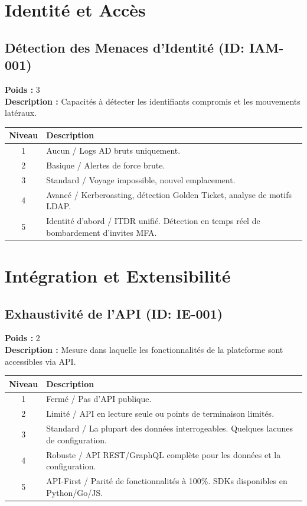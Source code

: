 \documentclass{article}
\begin{document}
\section{Identité et Accès}
\subsection{Détection des Menaces d'Identité (ID: IAM-001)}
\textbf{Poids :} 3 \\
\textbf{Description :} Capacités à détecter les identifiants compromis et les mouvements latéraux.
\vspace{0.3cm}
\begin{longtable}{|c|p{12cm}|}
\hline
\rowcolor{lightgray} \textbf{Niveau} & \textbf{Description} \\ \hline
1 & Aucun / Logs AD bruts uniquement. \\ \hline
2 & Basique / Alertes de force brute. \\ \hline
3 & Standard / Voyage impossible, nouvel emplacement. \\ \hline
4 & Avancé / Kerberoasting, détection Golden Ticket, analyse de motifs LDAP. \\ \hline
5 & Identité d'abord / ITDR unifié. Détection en temps réel de bombardement d'invites MFA. \\ \hline
\end{longtable}
\vspace{0.5cm}
\section{Intégration et Extensibilité}
\subsection{Exhaustivité de l'API (ID: IE-001)}
\textbf{Poids :} 2 \\
\textbf{Description :}  Mesure dans laquelle les fonctionnalités de la plateforme sont accessibles via API.
\vspace{0.3cm}
\begin{longtable}{|c|p{12cm}|}
\hline
\rowcolor{lightgray} \textbf{Niveau} & \textbf{Description} \\ \hline
1 & Fermé / Pas d'API publique. \\ \hline
2 & Limité / API en lecture seule ou points de terminaison limités. \\ \hline
3 & Standard / La plupart des données interrogeables. Quelques lacunes de configuration. \\ \hline
4 & Robuste / API REST/GraphQL complète pour les données et la configuration. \\ \hline
5 & API-First / Parité de fonctionnalités à 100\%. SDKs disponibles en Python/Go/JS. \\ \hline
\end{longtable}
\vspace{0.5cm}
\end{document}
